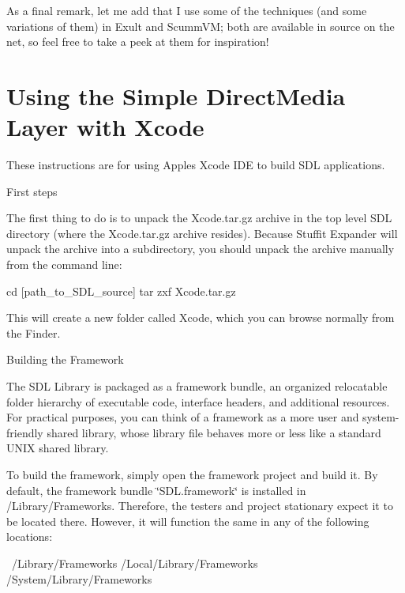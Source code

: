As a final remark, let me add that I use some of the techniques (and some variations of them) in Exult and Scumm\+VM; both are available in source on the net, so feel free to take a peek at them for inspiration!



 \section*{Using the Simple Direct\+Media Layer with Xcode }

These instructions are for using Apple\textquotesingle{}s Xcode I\+DE to build S\+DL applications.


\begin{DoxyItemize}
\item First steps
\end{DoxyItemize}

The first thing to do is to unpack the Xcode.\+tar.\+gz archive in the top level S\+DL directory (where the Xcode.\+tar.\+gz archive resides). Because Stuffit Expander will unpack the archive into a subdirectory, you should unpack the archive manually from the command line\+: \begin{DoxyVerb}cd [path_to_SDL_source]
tar zxf Xcode.tar.gz
\end{DoxyVerb}


This will create a new folder called Xcode, which you can browse normally from the Finder.


\begin{DoxyItemize}
\item Building the Framework
\end{DoxyItemize}

The S\+DL Library is packaged as a framework bundle, an organized relocatable folder hierarchy of executable code, interface headers, and additional resources. For practical purposes, you can think of a framework as a more user and system-\/friendly shared library, whose library file behaves more or less like a standard U\+N\+IX shared library.

To build the framework, simply open the framework project and build it. By default, the framework bundle \char`\"{}\+S\+D\+L.\+framework\char`\"{} is installed in /\+Library/\+Frameworks. Therefore, the testers and project stationary expect it to be located there. However, it will function the same in any of the following locations\+: \begin{DoxyVerb}~/Library/Frameworks
/Local/Library/Frameworks
/System/Library/Frameworks
\end{DoxyVerb}



